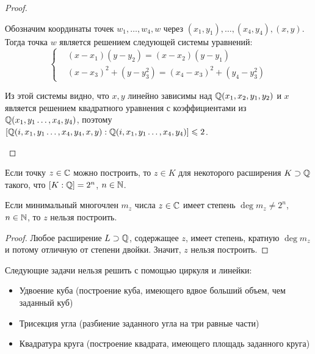 \begin{proof}
\begin{itemize}
\begin{center}
		\end{center}
		
		 Обозначим координаты точек $w_1, \dotsc, w_4, w$ через $(x_1, y_1), \dotsc, (x_4, y_4), (x, y)$. Тогда точка $w$ является решением следующей системы уравнений:
		\[\left\{\begin{aligned}
			&(x - x_1)(y - y_2) = (x - x_2)(y - y_1)\\
			&(x - x_3)^2 + (y - y_3^2) = (x_4 - x_3)^2 + (y_4 - y_3^2)
		\end{aligned}\right.\]
		
		Из этой системы видно, что $x, y$ линейно зависимы над $\mathbb{Q}(x_1, x_2, y_1, y_2)$ и $x$ является решением квадратного уравнения с коэффициентами из $\mathbb{Q}(x_1, y_1 \dotsc, x_4, y_4)$, поэтому $[\mathbb{Q}(i, x_1, y_1 \dotsc, x_4, y_4, x, y) : \mathbb{Q}(i, x_1, y_1 \dotsc, x_4, y_4)] \leqslant 2$.\qedhere
	\end{itemize}
\end{proof}

\begin{corollary}
	Если точку $z \in \mathbb{C}$ можно построить, то $z \in K$ для некоторого расширения $K \supset \mathbb{Q}$ такого, что $[K : \mathbb{Q}] = 2^n$, $n \in \mathbb{N}$.
\end{corollary}

\begin{corollary}
	Если минимальный многочлен $m_z$ числа $z \in \mathbb{C}$ имеет степень $\deg{m_z} \ne 2^n$, $n \in \mathbb{N}$, то $z$ нельзя построить.
\end{corollary}

\begin{proof}
	Любое расширение $L \supset \mathbb{Q}$, содержащее $z$, имеет степень, кратную $\deg{m_z}$ и потому отличную от степени двойки. Значит, $z$ нельзя построить.
\end{proof}

\begin{theorem}
	Следующие задачи нельзя решить с помощью циркуля и линейки:
	\begin{itemize}
		\item Удвоение куба (построение куба, имеющего вдвое больший объем, чем заданный куб)
		\item Трисекция угла (разбиение заданного угла на три равные части)
		\item Квадратура круга (построение квадрата, имеющего площадь заданного круга)
	\end{itemize}
\end{theorem}

